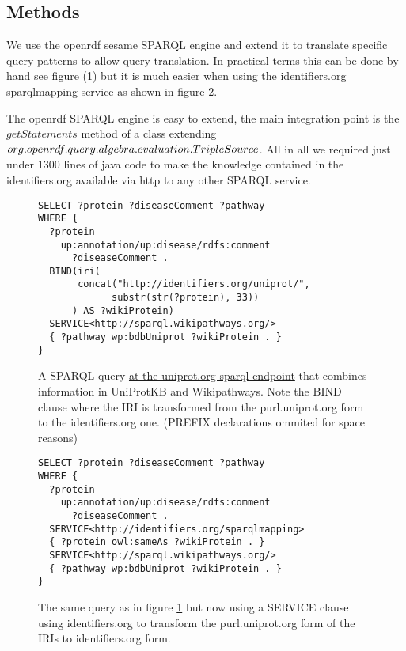 \documentclass{bioinfo}
\begin{document}
\begin{methods}
\section{Methods}

We use the openrdf sesame SPARQL engine\cite{SESAME} and extend it to translate specific query patterns to allow query translation.
In practical terms this can be done by hand see figure (\ref{stringstuff}) but it is much easier when using the identifiers.org sparqlmapping service as shown in figure \ref{translatestuff}.

The openrdf SPARQL engine is easy to extend, the main integration point is the $getStatements$ method of a class extending $org.openrdf.query\linebreak.algebra.evaluation.TripleSource$.
All in all we required just under 1300 lines of java code to make the knowledge contained in the identifiers.org available via http to any other SPARQL service.


\begin{figure}
\begin{verbatim}
SELECT ?protein ?diseaseComment ?pathway
WHERE {
  ?protein 
    up:annotation/up:disease/rdfs:comment 
      ?diseaseComment .
  BIND(iri(
       concat("http://identifiers.org/uniprot/", 
             substr(str(?protein), 33))
      ) AS ?wikiProtein)
  SERVICE<http://sparql.wikipathways.org/>
  { ?pathway wp:bdbUniprot ?wikiProtein . }
}
\end{verbatim}
  \caption{A SPARQL query \href{http://beta.sparql.uniprot.org/sparql}{at the uniprot.org sparql endpoint} that combines information
  in UniProtKB and Wikipathways. Note the BIND clause where the IRI is transformed from the purl.uniprot.org form to the identifiers.org one. (PREFIX declarations ommited for space reasons)}
  \label{stringstuff}
\end{figure}

\begin{figure}
\begin{verbatim}
SELECT ?protein ?diseaseComment ?pathway
WHERE {
  ?protein 
    up:annotation/up:disease/rdfs:comment 
      ?diseaseComment .
  SERVICE<http://identifiers.org/sparqlmapping>
  { ?protein owl:sameAs ?wikiProtein . }
  SERVICE<http://sparql.wikipathways.org/>
  { ?pathway wp:bdbUniprot ?wikiProtein . }
}
\end{verbatim}
  \caption{The same query as in figure \ref{stringstuff} but now using a SERVICE clause using identifiers.org to transform the purl.uniprot.org form of the IRIs to identifiers.org form.}
  \label{translatestuff}
\end{figure} 




\end{methods}
\end{document}
